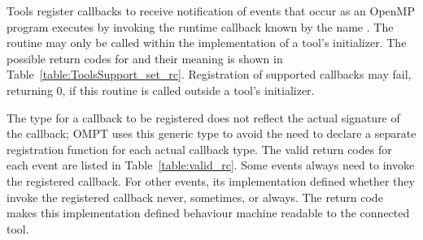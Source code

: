 Tools register callbacks to receive notification of events that occur as
an OpenMP program executes by invoking the runtime callback known by the name
.
The  routine may only be called within
the implementation of a tool's initializer.  The possible return
codes for  and their meaning is shown in
Table~\ref{table:ToolsSupport_set_rc}.  Registration of supported
callbacks may fail, returning 0, if this routine is called outside
a tool's initializer.  

The  type for a callback to be registered 
does not reflect the actual signature of the callback; 
OMPT uses this generic type
to avoid the need to declare a separate registration function for each actual callback type.
The valid return codes for each event are listed in Table~\ref{table:valid_rc}.
Some events always need to invoke the registered callback.
For other events, its implementation defined whether they invoke the registered
callback never, sometimes, or always.
The return code makes this implementation defined behaviour machine readable to
the connected tool.

